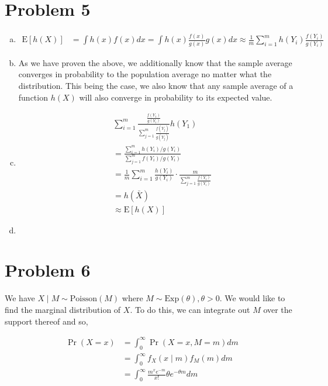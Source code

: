 \documentclass[11pt]{article}
\begin{document}
\section*{Problem 5}

\begin{enumerate}[(a)]
  \item 
    \begin{align*}
      \mathrm{E}[h(X)] &= \int h(x) f(x) dx = \int h(x)
      \frac{f(x)}{g(x)} g(x) dx \approx \frac{1}{m} \sum_{i=1}^m
      h(Y_i) \frac{f(Y_i)}{g(Y_i)}
    \end{align*}

  \item As we have proven the above, we additionally know that the
    sample average converges in probability to the population average
    no matter what the distribution.  This being the case, we also
    know that any sample average of a function $h(X)$ will also
    converge in probability to its expected value.

  \item 
    \begin{align*}
      &\sum_{i=1}^m \frac{\frac{f(Y_1)}{g(Y_i)}}{\sum_{j=1}^m
        \frac{f(Y_j)}{g(Y_j)}} h(Y_1) \\ 
      &= \frac{\sum_{i=1}^m
        h(Y_i)/g(Y_i)}{\sum_{j=1}^m f(Y_i)/g(Y_i)} \\
      &= \frac{1}{m} \sum_{i=1}^m \frac{h(Y_i)}{g(Y_i)} \cdot
      \frac{m}{\sum_{j=1}^m \frac{f(Y_i)}{g(Y_i)}} \\
      &= h(\bar{X}) \\
      &\approx \mathrm{E}[h(X)]
    \end{align*}

  \item

\end{enumerate}

\section*{Problem 6}

We have $X \mid M \sim \mathrm{Poisson}(M)$ where $M \sim
\mathrm{Exp}(\theta), \theta > 0$.  We would like to find the marginal
distribution of $X$.  To do this, we can integrate out $M$ over the
support thereof and so,

\begin{align*}
  \Pr{(X = x)} &= \int_0^{\infty} \Pr{(X=x,M=m)} dm \\
  &= \int_0^{\infty} f_X(x \mid m) f_M(m) dm \\
  &= \int_0^{\infty} \frac{m^x e^{-m}}{x!}
    \theta e^{-\theta m} dm
\end{align*}
\end{document}
